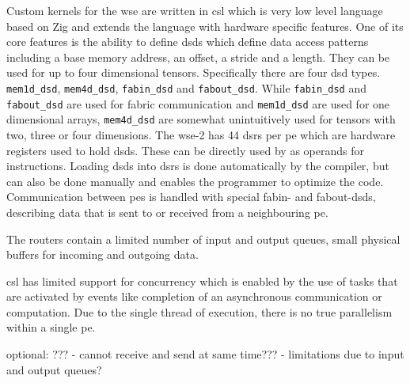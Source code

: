 Custom kernels for the \ac{wse} are written in \ac{csl} which is very low level language based on Zig and extends the language with hardware specific features.
One of its core features is the ability to define \acp{dsd} which define data access patterns including a base memory address, an offset, a stride and a length. They can be used for up to four dimensional tensors. Specifically there are four \ac{dsd} types. \texttt{mem1d\_dsd}, \texttt{mem4d\_dsd}, \texttt{fabin\_dsd} and \texttt{fabout\_dsd}. While \texttt{fabin\_dsd} and \texttt{fabout\_dsd} are used for fabric communication and \texttt{mem1d\_dsd} are used for one dimensional arrays, \texttt{mem4d\_dsd} are somewhat unintuitively used for tensors with two, three or four dimensions. The \ac{wse}-2 has 44 \acp{dsr} per \ac{pe} which are hardware registers used to hold \acp{dsd}. These can be directly used by as operands for instructions. Loading \acp{dsd} into \acp{dsr} is done automatically by the compiler, but can also be done manually and enables the programmer to optimize the code. Communication between \acp{pe} is handled with special fabin- and fabout-\acp{dsd}, describing data that is sent to or received from a neighbouring \ac{pe}.

The routers contain a limited number of input and output queues, small physical buffers for incoming and outgoing data.

\ac{csl} has limited support for concurrency which is enabled by the use of tasks that are activated by events like completion of an asynchronous communication or computation. Due to the single thread of execution, there is no true parallelism within a single \ac{pe}.

optional: ???
- cannot receive and send at same time???
- limitations due to input and output queues? 
